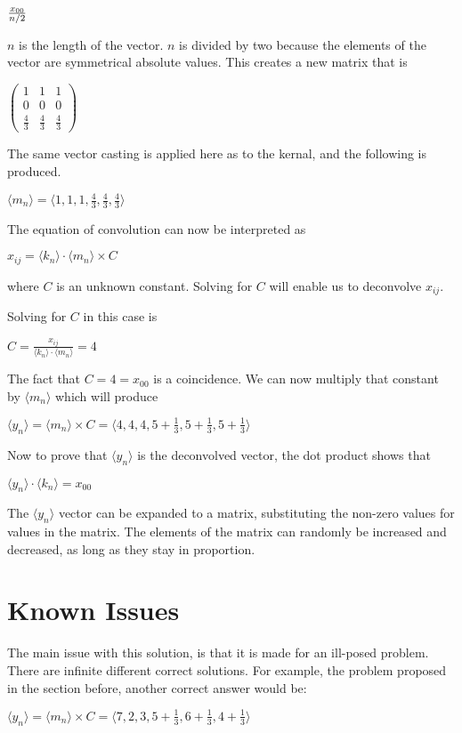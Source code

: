 \documentclass{article}
\begin{document}
${x_{00}} \over {n/2}$

$n$ is the length of the vector. $n$ is divided by two because the elements of the vector are symmetrical absolute values. This creates a new matrix that is

$\left( \begin{array}{ccc}
1 & 1 & 1 \\
0 & 0 & 0 \\
\frac{4}{3} & \frac{4}{3} & \frac{4}{3} \end{array} \right)$

The same vector casting is applied here as to the kernal, and the following is produced.

$\langle m_n \rangle = \langle 1, 1, 1, \frac{4}{3}, \frac{4}{3}, \frac{4}{3} \rangle$

The equation of convolution can now be interpreted as


$x_{ij}=\langle k_n \rangle \cdot \langle m_n \rangle \times C$

where $C$ is an unknown constant. Solving for $C$ will enable us to deconvolve $x_{ij}$.

Solving for $C$ in this case is


$C = \frac{x_{ij}}{\langle k_n \rangle \cdot \langle m_n \rangle} = 4$

The fact that $C = 4 = x_{00}$ is a coincidence. We can now multiply that constant by $\langle m_n \rangle$ which will produce


$\langle y_n \rangle = \langle m_n \rangle \times C = \langle 4, 4, 4, 5 + \frac{1}{3}, 5 + \frac{1}{3}, 5 + \frac{1}{3} \rangle$

Now to prove that $\langle y_n \rangle$ is the deconvolved vector, the dot product shows that


$\langle y_n \rangle \cdot \langle k_n \rangle = x_{00}$

The $\langle y_n \rangle$ vector can be expanded to a matrix, substituting the non-zero values for values in the matrix. The elements of the matrix can randomly be increased and decreased, as long as they stay in proportion. 

\section{Known Issues}
The main issue with this solution, is that it is made for an ill-posed problem. There are infinite different correct solutions. For example, the problem proposed in the section before, another correct answer would be:

$\langle y_n \rangle = \langle m_n \rangle \times C = \langle 7, 2, 3, 5 + \frac{1}{3}, 6 + \frac{1}{3}, 4 + \frac{1}{3} \rangle$
\end{document}
